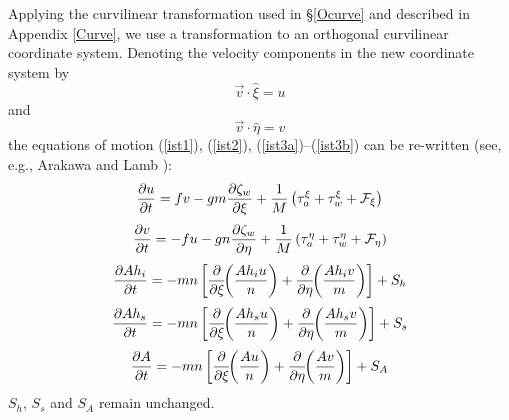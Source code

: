 Applying the curvilinear transformation used in \S\ref{Ocurve} and
described in Appendix \ref{Curve}, we use a transformation to an
orthogonal curvilinear coordinate system.  Denoting the velocity
components in the new coordinate system by
\begin{equation}
   \vec{v} \cdot \hat{\xi} = u
\end{equation}
and
\begin{equation}
   \vec{v} \cdot \hat{\eta} = v
\end{equation}
the equations of motion (\ref{ist1}), (\ref{ist2}),
(\ref{ist3a})--(\ref{ist3b}) can be re-written
(see, e.g., Arakawa and Lamb \cite{AL}):
{\samepage
\begin{equation}
   {\partial u \over \partial t} = fv
   - gm {\partial \zeta_w \over \partial \xi} +
   {1 \over M} \left( \tau_a^{\xi} + \tau_w^{\xi} + {\cal F}_{\xi}
   \right)
\label{ist13}
\end{equation}
}
\vspace{.2cm}
{\samepage
\begin{equation}
   {\partial v \over \partial t} = - fu
   - gn {\partial \zeta_w \over \partial \eta} +
   {1 \over M} \left( \tau_a^{\eta} + \tau_w^{\eta} + {\cal F}_{\eta}
   \right)
\label{ist14}
\end{equation}
}
\begin{equation}
   {\partial A h_i \over \partial t} =
   - mn \left[ {\partial \over \partial \xi} \!\!
   \left( {A h_i u \over n}
   \right ) + {\partial \over \partial \eta} \!\!
   \left( {A h_i v \over m}
   \right) \right] + S_h
\label{ist15}
\end{equation}
\begin{equation}
   {\partial A h_s \over \partial t} =
   - mn \left[ {\partial \over \partial \xi} \!\!
   \left( {A h_s u \over n}
   \right ) + {\partial \over \partial \eta} \!\!
   \left( {A h_s v \over m}
   \right) \right] + S_s
\label{ist15a}
\end{equation}
\begin{equation}
   {\partial A \over \partial t} =
   - mn \left[ {\partial \over \partial \xi} \!\! \left( {Au \over n}
   \right ) + {\partial \over \partial \eta} \!\! \left( {Av \over m}
   \right) \right] + S_A
\label{ist16}
\end{equation}
\vspace{.2cm}
$S_h$, $S_s$ and $S_A$ remain unchanged.

